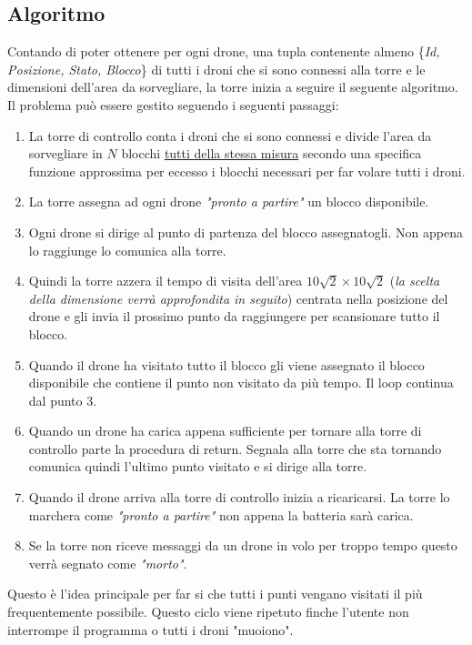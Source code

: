 \documentclass[a4paper, 11pt]{article}
\begin{document}
\subsection{Algoritmo}
Contando di poter ottenere per ogni drone, una tupla contenente almeno \{\textit{Id, Posizione, Stato, Blocco}\} di tutti i droni che si sono connessi alla torre e le dimensioni dell'area da sorvegliare, la torre inizia a seguire il seguente algoritmo.
Il problema può essere gestito seguendo i seguenti passaggi:
\begin{enumerate}
    
    \item La torre di controllo conta i droni che si sono connessi e divide l'area da sorvegliare in $N$ blocchi \underline{tutti della stessa misura}
     secondo una specifica funzione approssima per eccesso i blocchi necessari per far volare tutti i droni.

    \item La torre assegna ad ogni drone \textit{"pronto a partire"} un blocco disponibile.

    \item Ogni drone si dirige al punto di partenza del blocco assegnatogli. Non appena lo raggiunge lo comunica alla torre.

    \item Quindi la torre azzera il tempo di visita dell'area $10\sqrt 2\times 10\sqrt 2$ (\textit{la scelta della dimensione verrà approfondita in seguito}) centrata nella posizione del drone e gli invia il prossimo punto da raggiungere
     per scansionare tutto il blocco.

    \item Quando il drone ha visitato tutto il blocco gli viene assegnato il blocco disponibile che contiene il punto non visitato da più tempo. Il loop continua dal punto 3.
    \item Quando un drone ha carica appena sufficiente per tornare alla torre di controllo parte la procedura di return. 
    Segnala alla torre che sta tornando comunica quindi l'ultimo punto visitato e si dirige alla torre.
    
    \item Quando il drone arriva alla torre di controllo inizia a ricaricarsi.
    La torre lo marchera come \textit{"pronto a partire"} non appena la batteria sarà carica.

    \item Se la torre non riceve messaggi da un drone in volo per troppo tempo questo verrà segnato come \textit{"morto"}. 
\end{enumerate}
Questo è l'idea principale per far si che tutti i punti vengano visitati il più frequentemente possibile.
Questo ciclo viene ripetuto finche l'utente non interrompe il programma o tutti i droni "muoiono".
\end{document}
